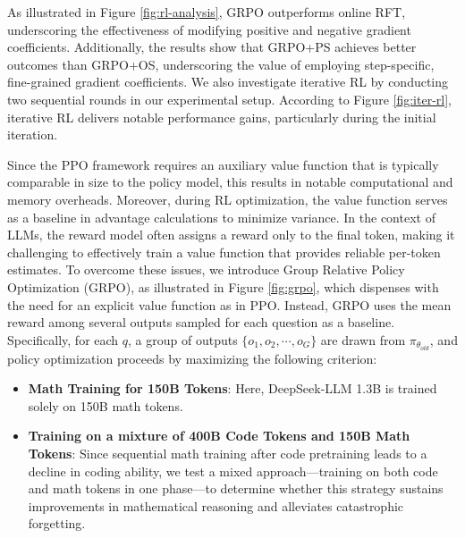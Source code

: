 As illustrated in Figure \ref{fig:rl-analysis}, GRPO outperforms online RFT, underscoring the effectiveness of modifying positive and negative gradient coefficients. Additionally, the results show that GRPO+PS achieves better outcomes than GRPO+OS, underscoring the value of employing step-specific, fine-grained gradient coefficients. We also investigate iterative RL by conducting two sequential rounds in our experimental setup. According to Figure \ref{fig:iter-rl}, iterative RL delivers notable performance gains, particularly during the initial iteration.

Since the PPO framework requires an auxiliary value function that is typically comparable in size to the policy model, this results in notable computational and memory overheads. Moreover, during RL optimization, the value function serves as a baseline in advantage calculations to minimize variance. In the context of LLMs, the reward model often assigns a reward only to the final token, making it challenging to effectively train a value function that provides reliable per-token estimates. To overcome these issues, we introduce Group Relative Policy Optimization (GRPO), as illustrated in Figure \ref{fig:grpo}, which dispenses with the need for an explicit value function as in PPO. Instead, GRPO uses the mean reward among several outputs sampled for each question as a baseline. Specifically, for each $q$, a group of outputs $\{o_1, o_2, \cdots, o_G\}$ are drawn from $\pi_{\theta_{old}}$, and policy optimization proceeds by maximizing the following criterion:

\begin{itemize}[topsep=0pt]
    \item \textbf{Math Training for 150B Tokens}: Here, DeepSeek-LLM 1.3B is trained solely on 150B math tokens.
    \item \textbf{Training on a mixture of 400B Code Tokens and 150B Math Tokens}: Since sequential math training after code pretraining leads to a decline in coding ability, we test a mixed approach—training on both code and math tokens in one phase—to determine whether this strategy sustains improvements in mathematical reasoning and alleviates catastrophic forgetting.
\end{itemize}

